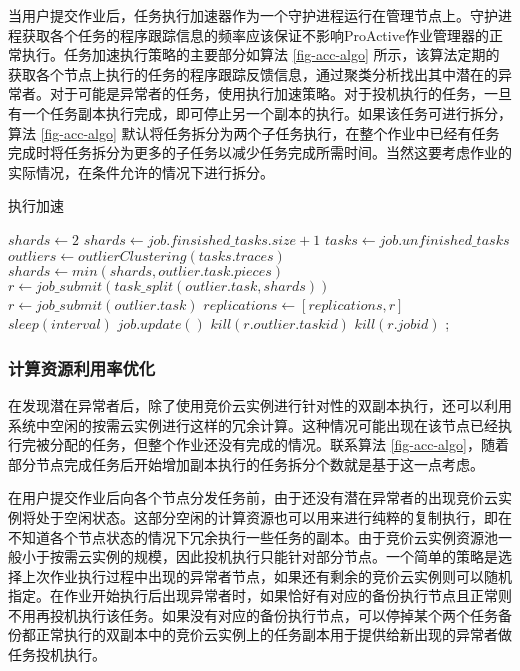 当用户提交作业后，任务执行加速器作为一个守护进程运行在管理节点上。守护进程获取各个任务的程序跟踪信息的频率应该保证不影响ProActive作业管理器的正常执行。任务加速执行策略的主要部分如算法 \ref{fig-acc-algo} 所示，该算法定期的获取各个节点上执行的任务的程序跟踪反馈信息，通过聚类分析找出其中潜在的异常者。对于可能是异常者的任务，使用执行加速策略。对于投机执行的任务，一旦有一个任务副本执行完成，即可停止另一个副本的执行。如果该任务可进行拆分，算法 \ref{fig-acc-algo} 默认将任务拆分为两个子任务执行，在整个作业中已经有任务完成时将任务拆分为更多的子任务以减少任务完成所需时间。当然这要考虑作业的实际情况，在条件允许的情况下进行拆分。
\begin{algorithm}
\caption{执行加速}
\label{fig-acc-algo}
$shards\gets 2$
{
  {
    $shards\gets job.finsished\_tasks.size + 1$\;
  }
  $tasks\gets job.unfinished\_tasks$\;
  $outliers\gets outlierClustering(tasks.traces)$\;
  {
    {
      {
        $shards\gets min(shards, outlier.task.pieces)$\;
        $r\gets job\_submit(task\_split(outlier.task, shards))$\;
      }{
        $r\gets job\_submit(outlier.task)$\;
      }
      $replications\gets [replications, r]$\;
    }
  }
  $sleep(interval)$\;
  $job.update()$\;
  {
    {
      $kill(r.outlier.taskid)$\;
    }
    {
      $kill(r.jobid)$\;
    }
  }
}
;
\end{algorithm}

\subsubsection{计算资源利用率优化}
在发现潜在异常者后，除了使用竞价云实例进行针对性的双副本执行，还可以利用系统中空闲的按需云实例进行这样的冗余计算。这种情况可能出现在该节点已经执行完被分配的任务，但整个作业还没有完成的情况。联系算法 \ref{fig-acc-algo}，随着部分节点完成任务后开始增加副本执行的任务拆分个数就是基于这一点考虑。

在用户提交作业后向各个节点分发任务前，由于还没有潜在异常者的出现竞价云实例将处于空闲状态。这部分空闲的计算资源也可以用来进行纯粹的复制执行，即在不知道各个节点状态的情况下冗余执行一些任务的副本。由于竞价云实例资源池一般小于按需云实例的规模，因此投机执行只能针对部分节点。一个简单的策略是选择上次作业执行过程中出现的异常者节点，如果还有剩余的竞价云实例则可以随机指定。在作业开始执行后出现异常者时，如果恰好有对应的备份执行节点且正常则不用再投机执行该任务。如果没有对应的备份执行节点，可以停掉某个两个任务备份都正常执行的双副本中的竞价云实例上的任务副本用于提供给新出现的异常者做任务投机执行。

